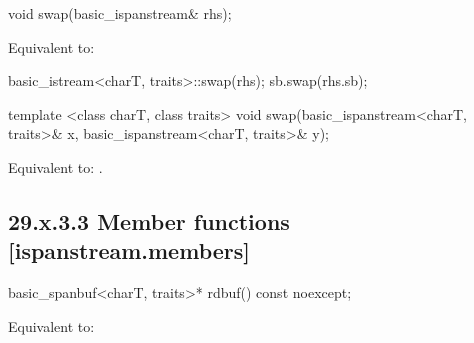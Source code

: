 \documentclass[ebook,11pt,article]{memoir}
\begin{document}
%

\begin{itemdecl}
void swap(basic_ispanstream& rhs);
\end{itemdecl}

\begin{itemdescr}
\pnum
\effects Equivalent to:
\begin{codeblock}
    basic_istream<charT, traits>::swap(rhs);
    sb.swap(rhs.sb);
\end{codeblock}
\end{itemdescr}


\begin{itemdecl}
template <class charT, class traits>
  void swap(basic_ispanstream<charT, traits>& x,
            basic_ispanstream<charT, traits>& y);
\end{itemdecl}

\begin{itemdescr}
\pnum
\effects Equivalent to: 
.
\end{itemdescr}

\subsection{29.x.3.3 Member functions [ispanstream.members]}
\label{ispanstream.members}

\begin{itemdecl}
basic_spanbuf<charT, traits>* rdbuf() const noexcept;
\end{itemdecl}

\begin{itemdescr}
\pnum
\effects Equivalent to:\\
\end{itemdescr}
\end{document}
